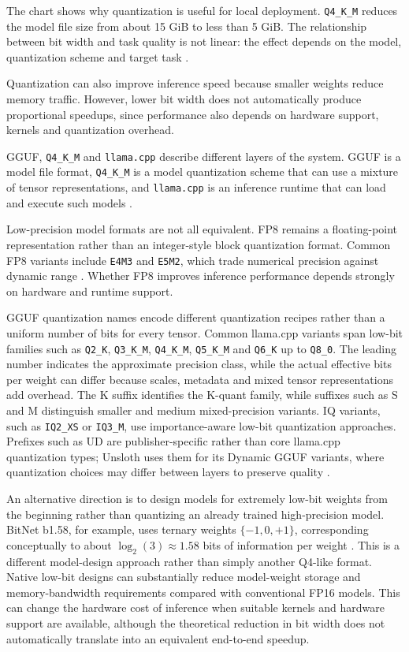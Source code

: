 The chart shows why quantization is useful for local deployment. \texttt{Q4\_K\_M} reduces the model file size from about 15 GiB to less than 5 GiB. The relationship between bit width and task quality is not linear: the effect depends on the model, quantization scheme and target task \parencite{ggml-quantize}.

Quantization can also improve inference speed because smaller weights reduce memory traffic. However, lower bit width does not automatically produce proportional speedups, since performance also depends on hardware support, kernels and quantization overhead.

GGUF, \texttt{Q4\_K\_M} and \texttt{llama.cpp} describe different layers of the system. GGUF is a model file format, \texttt{Q4\_K\_M} is a model quantization scheme that can use a mixture of tensor representations, and \texttt{llama.cpp} is an inference runtime that can load and execute such models \parencite{ggml-quantize,ggml-models}.

Low-precision model formats are not all equivalent. FP8 remains a floating-point representation rather than an integer-style block quantization format. Common FP8 variants include \texttt{E4M3} and \texttt{E5M2}, which trade numerical precision against dynamic range \parencite{nvidia-fp8}. Whether FP8 improves inference performance depends strongly on hardware and runtime support.

GGUF quantization names encode different quantization recipes rather than a uniform number of bits for every tensor. Common llama.cpp variants span low-bit families such as \texttt{Q2\_K}, \texttt{Q3\_K\_M}, \texttt{Q4\_K\_M}, \texttt{Q5\_K\_M} and \texttt{Q6\_K} up to \texttt{Q8\_0}. The leading number indicates the approximate precision class, while the actual effective bits per weight can differ because scales, metadata and mixed tensor representations add overhead. The K suffix identifies the K-quant family, while suffixes such as S and M distinguish smaller and medium mixed-precision variants. IQ variants, such as \texttt{IQ2\_XS} or \texttt{IQ3\_M}, use importance-aware low-bit quantization approaches. Prefixes such as UD are publisher-specific rather than core llama.cpp quantization types; Unsloth uses them for its Dynamic GGUF variants, where quantization choices may differ between layers to preserve quality \parencite{ggml-quantize,unsloth-dynamic}.

An alternative direction is to design models for extremely low-bit weights from the beginning rather than quantizing an already trained high-precision model. BitNet b1.58, for example, uses ternary weights \(\{-1,0,+1\}\), corresponding conceptually to about \(\log_2(3)\approx1.58\) bits of information per weight \parencite{ma2024bitnet}. This is a different model-design approach rather than simply another Q4-like format. Native low-bit designs can substantially reduce model-weight storage and memory-bandwidth requirements compared with conventional FP16 models. This can change the hardware cost of inference when suitable kernels and hardware support are available, although the theoretical reduction in bit width does not automatically translate into an equivalent end-to-end speedup.

